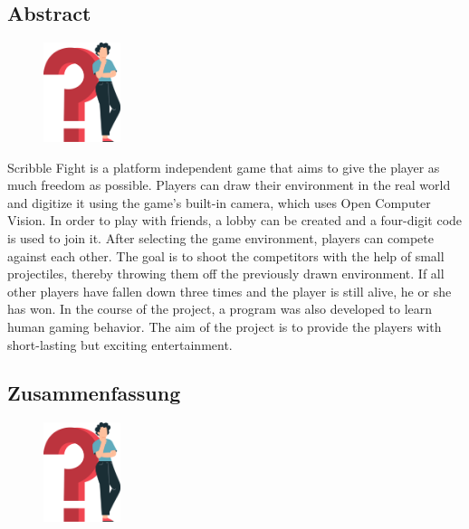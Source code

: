 \begin{spacing}{1}
  \chapter*{Abstract}
\end{spacing}
\begin{figure}
  \begin{center}
    \includegraphics[width=0.2\textwidth]{pics/question_mark.png}
  \end{center}
\end{figure}
Scribble Fight is a platform independent game that aims to give the player as much freedom as possible.
Players can draw their environment in the real world and digitize it using the game's built-in camera, which uses Open Computer Vision.
In order to play with friends, a lobby can be created and a four-digit code is used to join it.
After selecting the game environment, players can compete against each other.
The goal is to shoot the competitors with the help of small projectiles, thereby throwing them off the previously drawn environment.
If all other players have fallen down three times and the player is still alive, he or she has won.
In the course of the project, a program was also developed to learn human gaming behavior.
The aim of the project is to provide the players with short-lasting but exciting entertainment.
\newpage
\begin{spacing}{1}
  \chapter*{Zusammenfassung}
\end{spacing}
\begin{figure}
  \begin{center}
    \includegraphics[width=0.2\textwidth]{pics/question_mark.png}
  \end{center}
\end{figure}
